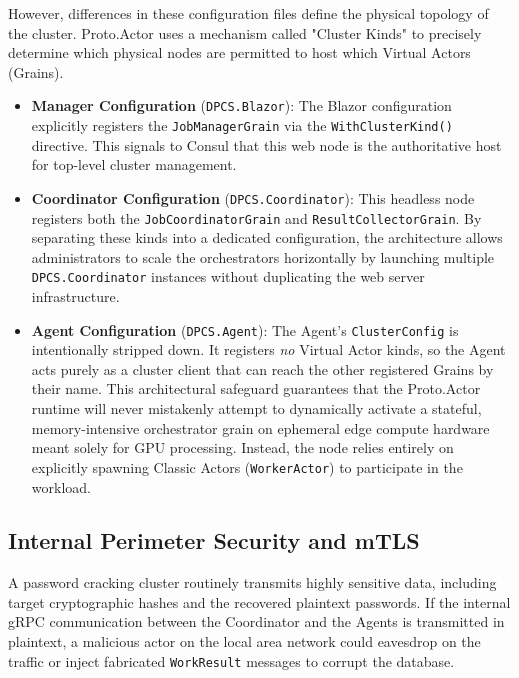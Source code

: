 However, differences in these configuration files define the physical topology of the cluster. Proto.Actor uses a mechanism called "Cluster Kinds" to precisely determine which physical nodes are permitted to host which Virtual Actors (Grains).
\begin{itemize}
    \item \textbf{Manager Configuration} (\verb|DPCS.Blazor|): The Blazor configuration explicitly registers the \verb|JobManagerGrain| via the \verb|WithClusterKind()| directive. This signals to Consul that this web node is the authoritative host for top-level cluster management.
    
    \item \textbf{Coordinator Configuration} (\verb|DPCS.Coordinator|): This headless node registers both the \verb|JobCoordinatorGrain| and \verb|ResultCollectorGrain|. By separating these kinds into a dedicated configuration, the architecture allows administrators to scale the orchestrators horizontally by launching multiple \verb|DPCS.Coordinator| instances without duplicating the web server infrastructure.
    
    \item \textbf{Agent Configuration} (\verb|DPCS.Agent|): The Agent's \verb|ClusterConfig| is intentionally stripped down. It registers \textit{no} Virtual Actor kinds, so the Agent acts purely as a cluster client that can reach the other registered Grains by their name. This architectural safeguard guarantees that the Proto.Actor runtime will never mistakenly attempt to dynamically activate a stateful, memory-intensive orchestrator grain on ephemeral edge compute hardware meant solely for GPU processing. Instead, the node relies entirely on explicitly spawning Classic Actors (\verb|WorkerActor|) to participate in the workload.
\end{itemize}

\subsection{Internal Perimeter Security and mTLS}

A password cracking cluster routinely transmits highly sensitive data, including target cryptographic hashes and the recovered plaintext passwords. If the internal gRPC communication between the Coordinator and the Agents is transmitted in plaintext, a malicious actor on the local area network could eavesdrop on the traffic or inject fabricated \verb|WorkResult| messages to corrupt the database.

